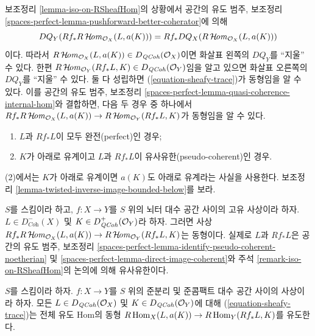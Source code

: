 \begin{remark}
\label{remark-iso-on-RSheafHom}
보조정리 \ref{lemma-iso-on-RSheafHom}의 상황에서
공간의 유도 범주, 보조정리
\ref{spaces-perfect-lemma-pushforward-better-coherator}에 의해
$$
DQ_Y(Rf_*R\mathop{\mathcal{H}\!\mathit{om}}\nolimits_{\mathcal{O}_X}(L, a(K))) =
Rf_* DQ_X(R\mathop{\mathcal{H}\!\mathit{om}}\nolimits_{\mathcal{O}_X}(L, a(K)))
$$
이다. 따라서
$R\mathop{\mathcal{H}\!\mathit{om}}\nolimits_{\mathcal{O}_X}(L, a(K)) \in D_{\mathit{QCoh}}(\mathcal{O}_X)$이면
화살표 왼쪽의 $DQ_Y$를 “지울” 수 있다.
한편
$R\mathop{\mathcal{H}\!\mathit{om}}\nolimits_{\mathcal{O}_Y}(Rf_*L, K) \in D_{\mathit{QCoh}}(\mathcal{O}_Y)$임을
알고 있으면 화살표 오른쪽의 $DQ_Y$를 “지울” 수 있다.
둘 다 성립하면 (\ref{equation-sheafy-trace})가 동형임을 알 수 있다.
이를 공간의 유도 범주, 보조정리
\ref{spaces-perfect-lemma-quasi-coherence-internal-hom}와 결합하면,
다음 두 경우 중 하나에서
$Rf_*R\mathop{\mathcal{H}\!\mathit{om}}\nolimits_{\mathcal{O}_X}(L, a(K)) \to
R\mathop{\mathcal{H}\!\mathit{om}}\nolimits_{\mathcal{O}_Y}(Rf_*L, K)$가 동형임을 알 수 있다.
\begin{enumerate}
\item $L$과 $Rf_*L$이 모두 완전(perfect)인 경우;
\item $K$가 아래로 유계이고 $L$과 $Rf_*L$이 유사유한(pseudo-coherent)인 경우.
\end{enumerate}
(2)에서는 $K$가 아래로 유계이면 $a(K)$도 아래로 유계라는 사실을 사용한다.
보조정리 \ref{lemma-twisted-inverse-image-bounded-below}를 보라.
\end{remark}

\begin{example}
\label{example-iso-on-RSheafHom-noetherian}
$S$를 스킴이라 하고,
$f : X \to Y$를 $S$ 위의 뇌터 대수 공간 사이의 고유 사상이라 하자.
$L \in D^-_{\textit{Coh}}(X)$ 및
$K \in D^+_{\mathit{QCoh}}(\mathcal{O}_Y)$라 하자.
그러면 사상
$Rf_*R\mathop{\mathcal{H}\!\mathit{om}}\nolimits_{\mathcal{O}_X}(L, a(K)) \to
R\mathop{\mathcal{H}\!\mathit{om}}\nolimits_{\mathcal{O}_Y}(Rf_*L, K)$는 동형이다.
실제로 $L$과 $Rf_*L$은 공간의 유도 범주, 보조정리
\ref{spaces-perfect-lemma-identify-pseudo-coherent-noetherian} 및
\ref{spaces-perfect-lemma-direct-image-coherent}와
주석 \ref{remark-iso-on-RSheafHom}의 논의에 의해 유사유한이다.
\end{example}

\begin{lemma}
\label{lemma-iso-global-hom}
$S$를 스킴이라 하자.
$f : X \to Y$를 $S$ 위의 준분리 및 준콤팩트 대수 공간 사이의 사상이라 하자.
모든 $L \in D_{\mathit{QCoh}}(\mathcal{O}_X)$ 및
$K \in D_{\mathit{QCoh}}(\mathcal{O}_Y)$에 대해
(\ref{equation-sheafy-trace})는 전체 유도 Hom의 동형
$R\mathop{\mathrm{Hom}}\nolimits_X(L, a(K))\allowbreak \to R\mathop{\mathrm{Hom}}\nolimits_Y(Rf_*L, K)$를 유도한다.
\end{lemma}

